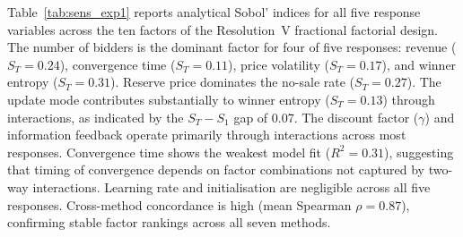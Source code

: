 Table~\ref{tab:sens_exp1} reports analytical Sobol' indices for all five response variables across the ten factors of the Resolution~V fractional factorial design. The number of bidders is the dominant factor for four of five responses: revenue ($S_T = 0.24$), convergence time ($S_T = 0.11$), price volatility ($S_T = 0.17$), and winner entropy ($S_T = 0.31$). Reserve price dominates the no-sale rate ($S_T = 0.27$). The update mode contributes substantially to winner entropy ($S_T = 0.13$) through interactions, as indicated by the $S_T - S_1$ gap of 0.07. The discount factor ($\gamma$) and information feedback operate primarily through interactions across most responses. Convergence time shows the weakest model fit ($R^2 = 0.31$), suggesting that timing of convergence depends on factor combinations not captured by two-way interactions. Learning rate and initialisation are negligible across all five responses. Cross-method concordance is high (mean Spearman $\rho = 0.87$), confirming stable factor rankings across all seven methods.

